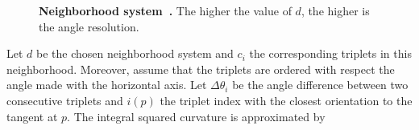 \begin{figure}
\center
{}\hspace{2em}
\caption{\textbf{Neighborhood system~\cite{nieuwenhuis14efficient}.} The higher the value of $d$, the higher is the angle resolution.}
\label{ch4:fig:nieuweinhuis-neighborhood}
\end{figure}

Let $d$ be the chosen neighborhood system and $c_i$ the corresponding triplets in this neighborhood. Moreover, assume that the triplets are ordered with respect the angle made with the horizontal axis. Let $\Delta \theta_i$ be the angle difference between two consecutive triplets and $i(p)$ the triplet index with the closest orientation to the tangent at $p$. The integral squared curvature is approximated by 

